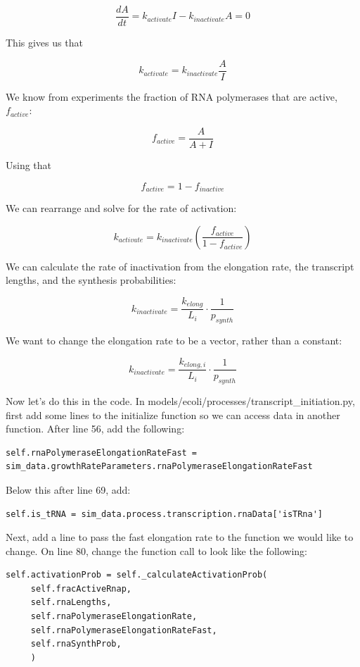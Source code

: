 \documentclass[12pt]{article}
\begin{document}
$$
\frac{dA}{dt}=k_{activate}I - k_{inactivate}A=0
$$

This gives us that

$$
k_{activate} = k_{inactivate}\frac{A}{I}
$$


We know from experiments the fraction of RNA polymerases that are active, $f_{active}$:

$$
f_{active}=\frac{A}{A+I}
$$

Using that 

$$
f_{active} = 1 - f_{inactive}
$$

We can rearrange and solve for the rate of activation:

$$
k_{activate}=k_{inactivate}\left(\frac{f_{active}}{1-f_{active}} \right)
$$

We can calculate the rate of inactivation from the elongation rate, the transcript lengths, and the synthesis probabilities:

$$
k_{inactivate}=\frac{k_{elong}}{L_i}\cdot\frac{1}{p_{synth}}
$$

We want to change the elongation rate to be a vector, rather than a constant:

$$
k_{inactivate}=\frac{k_{elong,i}}{L_i}\cdot \frac{1}{p_{synth}}
$$

Now let’s do this in the code. In models/ecoli/processes/transcript_initiation.py, first add some lines to the initialize function so we can access data in another function.  After line 56, add the following:

\begin{lstlisting}
self.rnaPolymeraseElongationRateFast = sim_data.growthRateParameters.rnaPolymeraseElongationRateFast
\end{lstlisting}

Below this after line 69, add:

\begin{lstlisting}
self.is_tRNA = sim_data.process.transcription.rnaData['isTRna']
\end{lstlisting}

Next, add a line to pass the fast elongation rate to the function we would like to change.  On line 80, change the function call to look like the following:

\begin{lstlisting}
self.activationProb = self._calculateActivationProb(
	 self.fracActiveRnap,
	 self.rnaLengths,
	 self.rnaPolymeraseElongationRate,
	 self.rnaPolymeraseElongationRateFast,
	 self.rnaSynthProb,
	 )
\end{lstlisting}
\end{document}

